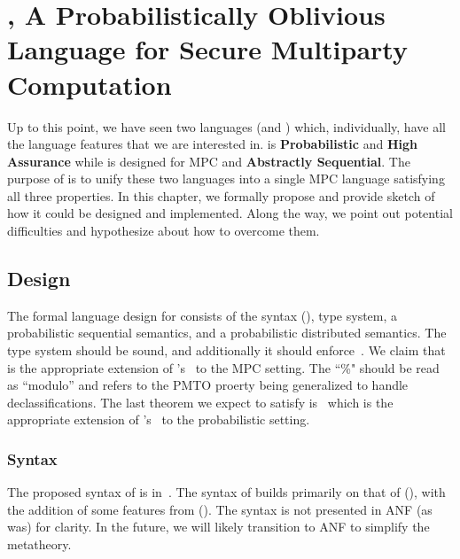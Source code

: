 \chapter{\lang, A Probabilistically Oblivious Language for Secure Multiparty Computation}
\label{ch:proposal}

Up to this point, we have seen two languages (\mpc and \obliv) which, individually, have all the language
features that we are interested in. \obliv is \textbf{Probabilistic} and \textbf{High Assurance} while \mpc
is designed for MPC and \textbf{Abstractly Sequential}. The purpose of \lang is to unify these two languages
into a single MPC language satisfying all three properties. In this chapter, we formally propose \lang and
provide sketch of how it could be designed and implemented. Along the way, we point out potential difficulties
and hypothesize about how to overcome them.

\section{Design}
\label{sec:proposal-design}

The formal language design for \lang consists of the syntax (), type system,
a probabilistic sequential semantics, and a probabilistic distributed semantics.
The type system should be sound, and additionally it should enforce~. We claim that~
is the appropriate extension of \obliv's~ to the MPC setting. The ``\%" should be read as ``modulo'' and refers
to the PMTO proerty being generalized to handle declassifications. The last theorem we expect \lang to satisfy is~
which is the appropriate extension of \mpc's~ to the probabilistic setting.


\subsection{Syntax}
\label{subsec:proposal-design-syntax}

The proposed syntax of \lang is in~. The syntax of \lang builds primarily
on that of \mpc (), with the addition of some features from \obliv ().
The syntax is not presented in ANF (as \mpc was) for clarity. In the future, we will likely transition
to ANF to simplify the metatheory.

